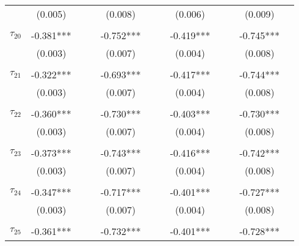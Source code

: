\begin{tabular}{@{\extracolsep{-2pt}}lccccccccccc}
            &  (0.005)  &&      &  (0.008)  &          &&  (0.006)  &&      &  (0.009)  &            \\
            &           &&      &           &          &&           &&      &           &            \\[-2.1ex]
$\tau_{20}$ & -0.381*** &&      & -0.752*** &          && -0.419*** &&      & -0.745*** &            \\
            &  (0.003)  &&      &  (0.007)  &          &&  (0.004)  &&      &  (0.008)  &            \\
            &           &&      &           &          &&           &&      &           &            \\[-2.1ex]
$\tau_{21}$ & -0.322*** &&      & -0.693*** &          && -0.417*** &&      & -0.744*** &            \\
            &  (0.003)  &&      &  (0.007)  &          &&  (0.004)  &&      &  (0.008)  &            \\
            &           &&      &           &          &&           &&      &           &            \\[-2.1ex]
$\tau_{22}$ & -0.360*** &&      & -0.730*** &          && -0.403*** &&      & -0.730*** &            \\
            &  (0.003)  &&      &  (0.007)  &          &&  (0.004)  &&      &  (0.008)  &            \\
            &           &&      &           &          &&           &&      &           &            \\[-2.1ex]
$\tau_{23}$ & -0.373*** &&      & -0.743*** &          && -0.416*** &&      & -0.742*** &            \\
            &  (0.003)  &&      &  (0.007)  &          &&  (0.004)  &&      &  (0.008)  &            \\
            &           &&      &           &          &&           &&      &           &            \\[-2.1ex]
$\tau_{24}$ & -0.347*** &&      & -0.717*** &          && -0.401*** &&      & -0.727*** &            \\
            &  (0.003)  &&      &  (0.007)  &          &&  (0.004)  &&      &  (0.008)  &            \\
            &           &&      &           &          &&           &&      &           &            \\[-2.1ex]
$\tau_{25}$ & -0.361*** &&      & -0.732*** &          && -0.401*** &&      & -0.728*** &            \\

\end{tabular}

